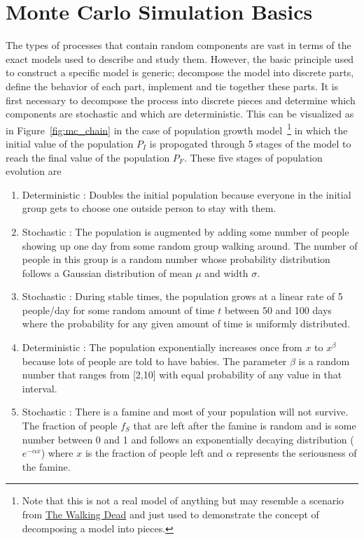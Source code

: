 \documentclass[UKenglish,texlive=2016]{\ATLASLATEXPATH atlasdoc}
\begin{document}
\section{Monte Carlo Simulation Basics}
\label{sec:mcintro}
The types of processes that contain random components are vast in terms of the exact models used to describe and study them.  However, the basic principle used to construct a specific model is generic; decompose the model into discrete parts, define the behavior of each part, implement and tie together these parts.  It is first necessary to decompose the process into discrete pieces and determine which components are stochastic and which are deterministic.  This can be visualized as in Figure~\ref{fig:mc_chain} in the case of population growth model~\footnote{Note that this is not a real model of anything but may resemble a scenario from \href{https://en.wikipedia.org/wiki/The\_Walking\_Dead\_(TV\_series)}{The Walking Dead} and just used to demonstrate the concept of decomposing a model into pieces.} in which the initial value of the population $P_I$ is propogated through 5 stages of the model to reach the final value of the population $P_F$.  These five stages of population evolution are

\begin{enumerate}
\item Deterministic : Doubles the initial population because everyone in the initial group gets to choose one outside person to stay with them.
\item Stochastic : The population is augmented by adding some number of people showing up one day from some random group walking around.  The number of people in this group is a random number whose probability distribution follows a Gaussian distribution of mean $\mu$ and width $\sigma$.  
\item Stochastic : During stable times, the population grows at a linear rate of 5 people/day for some random amount of time $t$ between 50 and 100 days where the probability for any given amount of time is uniformly distributed.
\item Deterministic : The population exponentially increases once from $x$ to $x^\beta$ because lots of people are told to have babies. The parameter $\beta$ is a random number that ranges from [2,10] with equal probability of any value in that interval.
\item Stochastic : There is a famine and most of your population will not survive.  The fraction of people $f_S$ that are left after the famine is random and is some number between 0 and 1 and follows an exponentially decaying distribution ($e^{-\alpha x}$) where $x$ is the fraction of people left and $\alpha$ represents the seriousness of the famine.
\end{enumerate}
\end{document}
